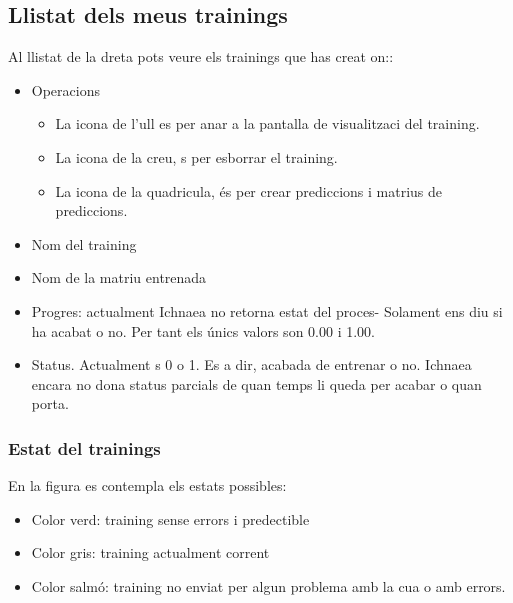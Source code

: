 \subsection{Llistat dels meus trainings}
Al llistat de la dreta pots veure els trainings que has creat on::
\begin{itemize}
\item Operacions
 \begin{itemize}
 \item La icona de l'ull es per anar a la pantalla de visualitzaci del training.
 \item La icona de la creu, s per esborrar el training.
 \item La icona de la quadricula, \'{e}s per crear prediccions i matrius de prediccions.
 \end{itemize}
\item Nom del training
\item Nom de la matriu entrenada
\item Progres: actualment Ichnaea no retorna estat del proces- Solament ens diu si ha acabat o no.  Per tant els \'{u}nics valors son 0.00 i 1.00.
\item Status. Actualment s 0 o 1. Es a dir, acabada de entrenar o no. Ichnaea encara no dona status parcials de quan temps li queda per acabar o quan porta.
\end{itemize}
\subsubsection*{Estat del trainings}
En la figura es contempla els estats possibles:
\begin{itemize}
\item Color verd: training sense errors i predectible
\item Color gris: training actualment corrent
\item Color salm\'{o}: training no enviat per algun problema amb la cua o amb errors.
\end{itemize}

